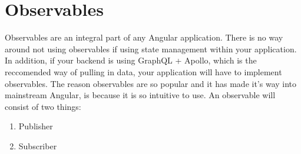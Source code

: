 \maketitle{}
\section{ Observables }
Observables are an integral part of any Angular application. There is no way 
around not using observables if using state management within your application. 
In addition, if your backend is using GraphQL + Apollo, which is the 
reccomended way of pulling in data, your application will have to implement 
observables. The reason observables are so popular and it has made it's way
into mainstream Angular, is because it is so intuitive to use. An observable 
will consist of two things: 
\begin{enumerate}
  \item Publisher 
  \item Subscriber
\end{enumerate}